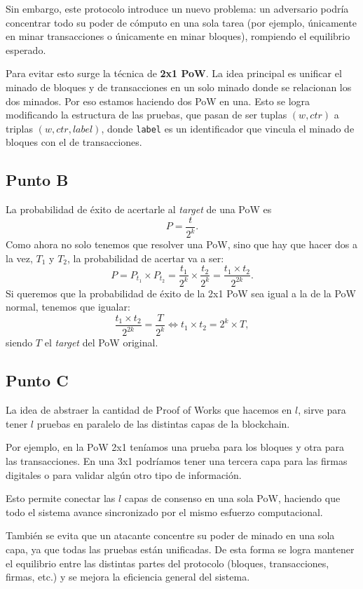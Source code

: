 \documentclass[12pt]{article}
\begin{document}
Sin embargo, este protocolo introduce un nuevo problema: un adversario podría concentrar todo su poder de cómputo en una sola tarea (por ejemplo, únicamente en minar transacciones o únicamente en minar bloques), rompiendo el equilibrio esperado.

Para evitar esto surge la técnica de \textbf{2x1 PoW}.  
La idea principal es unificar el minado de bloques y de transacciones en un solo minado donde se relacionan los dos minados. Por eso estamos haciendo dos PoW en una.  
Esto se logra modificando la estructura de las pruebas, que pasan de ser tuplas $(w, ctr)$ a triplas $(w, ctr, label)$, donde \texttt{label} es un identificador que vincula el minado de bloques con el de transacciones.

\subsection{Punto B}

La probabilidad de éxito de acertarle al \emph{target} de una PoW es
\[
P = \frac{t}{2^k}.
\]
Como ahora no solo tenemos que resolver una PoW, sino que hay que hacer dos a la vez, $T_1$ y $T_2$, la probabilidad de acertar va a ser:
\[
P = P_{t_1} \times P_{t_2} = \frac{t_1}{2^k} \times \frac{t_2}{2^k} = \frac{t_1 \times t_2}{2^{2k}}.
\]
Si queremos que la probabilidad de éxito de la 2x1 PoW sea igual a la de la PoW normal, tenemos que igualar:
\[
\frac{t_1 \times t_2}{2^{2k}} = \frac{T}{2^k} \iff t_1 \times t_2 = 2^k \times T,
\]
siendo $T$ el \emph{target} del PoW original.

\subsection{Punto C}

La idea de abstraer la cantidad de Proof of Works que hacemos en $l$, sirve para tener $l$ pruebas en paralelo de las distintas capas de la blockchain.

Por ejemplo, en la PoW 2x1 teníamos una prueba para los bloques y otra para las transacciones. En una 3x1 podríamos tener una tercera capa para las firmas digitales o para validar algún otro tipo de información.

Esto permite conectar las $l$ capas de consenso en una sola PoW, haciendo que todo el sistema avance sincronizado por el mismo esfuerzo computacional.

También se evita que un atacante concentre su poder de minado en una sola capa, ya que todas las pruebas están unificadas.  
De esta forma se logra mantener el equilibrio entre las distintas partes del protocolo (bloques, transacciones, firmas, etc.) y se mejora la eficiencia general del sistema.
\end{document}
